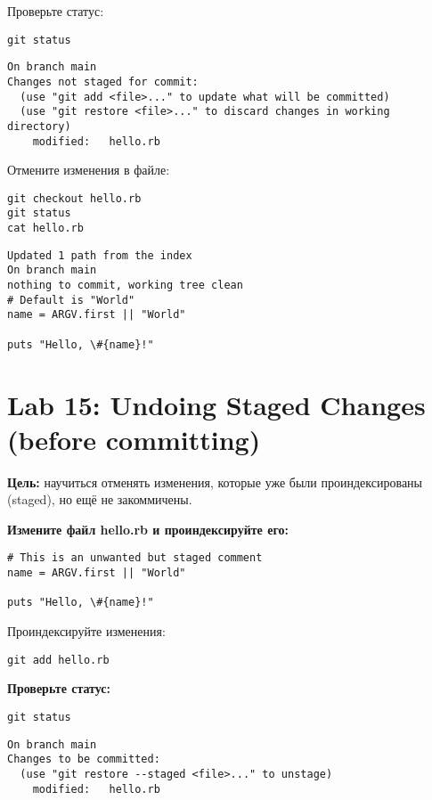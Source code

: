 \documentclass[a4paper,12pt]{report}
\begin{document}
Проверьте статус:
\begin{verbatim}
git status
\end{verbatim}

\begin{verbatim}
On branch main
Changes not staged for commit:
  (use "git add <file>..." to update what will be committed)
  (use "git restore <file>..." to discard changes in working directory)
	modified:   hello.rb
\end{verbatim}

Отмените изменения в файле:
\begin{verbatim}
git checkout hello.rb
git status
cat hello.rb
\end{verbatim}

\begin{verbatim}
Updated 1 path from the index
On branch main
nothing to commit, working tree clean
# Default is "World"
name = ARGV.first || "World"

puts "Hello, \#{name}!"
\end{verbatim}

\section{Lab 15: Undoing Staged Changes (before committing)}
\textbf{Цель:} научиться отменять изменения, которые уже были проиндексированы (staged), но ещё не закоммичены.

\textbf{Измените файл hello.rb и проиндексируйте его:}

\begin{verbatim}
# This is an unwanted but staged comment
name = ARGV.first || "World"

puts "Hello, \#{name}!"
\end{verbatim}

Проиндексируйте изменения:
\begin{verbatim}
git add hello.rb
\end{verbatim}

\textbf{Проверьте статус:}
\begin{verbatim}
git status
\end{verbatim}
\begin{verbatim}
On branch main
Changes to be committed:
  (use "git restore --staged <file>..." to unstage)
	modified:   hello.rb
\end{verbatim}

\end{document}
